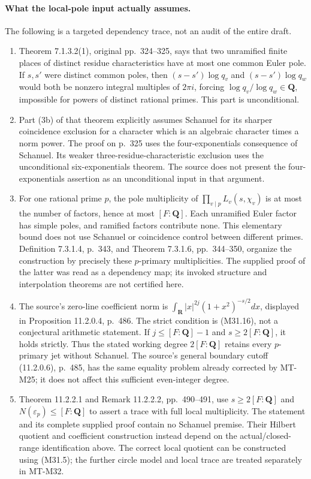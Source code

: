 \paragraph{What the local-pole input actually assumes.}
The following is a targeted dependency trace, not an audit
of the entire draft.
\begin{enumerate}
\item Theorem 7.1.3.2(1), original pp.~324--325, says that
two unramified finite places of distinct residue
characteristics have at most one common Euler pole.
If $s,s'$ were distinct common poles, then
$(s-s')\log q_v$ and $(s-s')\log q_w$ would both be
nonzero integral multiples of $2\pi i$, forcing
$\log q_v/\log q_w\in\mathbf Q$, impossible for powers
of distinct rational primes.  This part is unconditional.
\item Part (3b) of that theorem explicitly assumes Schanuel
for its sharper coincidence exclusion for a character
which is an algebraic character times a norm power.
The proof on p.~325 uses the four-exponentials consequence
of Schanuel.  Its weaker three-residue-characteristic
exclusion uses the unconditional six-exponentials theorem.
The source does not present the four-exponentials assertion
as an unconditional input in that argument.
\item For one rational prime $p$, the pole multiplicity of
$\prod_{v\mid p}L_v(s,\chi_v)$ is at most the number
of factors, hence at most $[F:\mathbf Q]$.
Each unramified Euler factor has simple poles, and ramified
factors contribute none.  This elementary bound does not
use Schanuel or coincidence control between different primes.
Definition 7.3.1.4, p.~343, and Theorem 7.3.1.6,
pp.~344--350, organize the construction by precisely these
$p$-primary multiplicities.  The supplied proof of the latter
was read as a dependency map; its invoked structure and
interpolation theorems are not certified here.
\item The source's zero-line coefficient norm is
$\int_{\mathbf R}|x|^{2j}(1+x^2)^{-s/2}dx$,
displayed in Proposition 11.2.0.4, p.~486.
The strict condition is (M31.16), not a conjectural
arithmetic statement.  If $j\leq [F:\mathbf Q]-1$
and $s\geq2[F:\mathbf Q]$, it holds strictly.
Thus the stated working degree $2[F:\mathbf Q]$
retains every $p$-primary jet without Schanuel.
The source's general boundary cutoff (11.2.0.6), p.~485,
has the same equality problem already corrected by MT-M25;
it does not affect this sufficient even-integer degree.
\item Theorem 11.2.2.1 and Remark 11.2.2.2,
pp.~490--491, use $s\geq2[F:\mathbf Q]$ and
$N(\varepsilon_p)\leq[F:\mathbf Q]$ to assert a
trace with full local multiplicity.  The statement and its
complete supplied proof contain no Schanuel premise.
Their Hilbert quotient and coefficient construction instead
depend on the actual/closed-range identification above.
The correct local quotient can be constructed using
(M31.5); the further circle model and local trace are
treated separately in MT-M32.
\end{enumerate}


